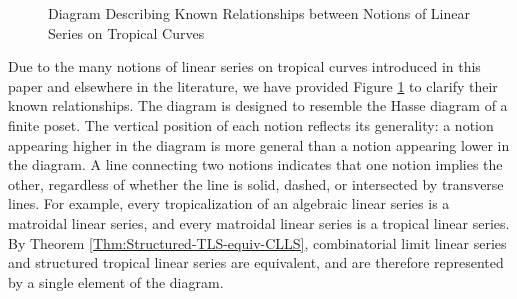 \documentclass{amsart}
\begin{document}
\begin{figure}
\begin{center}
		\end{center}
		\caption{Diagram Describing Known Relationships between Notions of Linear Series on Tropical Curves}
		\label{Fig:linear-series-poset}
	\end{figure}
	
	Due to the many notions of linear series on tropical curves introduced in this paper and elsewhere in the literature, we have provided Figure \ref{Fig:linear-series-poset} to clarify their known relationships. The diagram is designed to resemble the Hasse diagram of a finite poset. The vertical position of each notion reflects its generality: a notion appearing higher in the diagram is more general than a notion appearing lower in the diagram. A line connecting two notions indicates that one notion implies the other, regardless of whether the line is solid, dashed, or intersected by transverse lines. For example, every tropicalization of an algebraic linear series is a matroidal linear series, and every matroidal linear series is a tropical linear series. By Theorem \ref{Thm:Structured-TLS-equiv-CLLS}, combinatorial limit linear series and structured tropical linear series are equivalent, and are therefore represented by a single element of the diagram.
	
\end{document}
